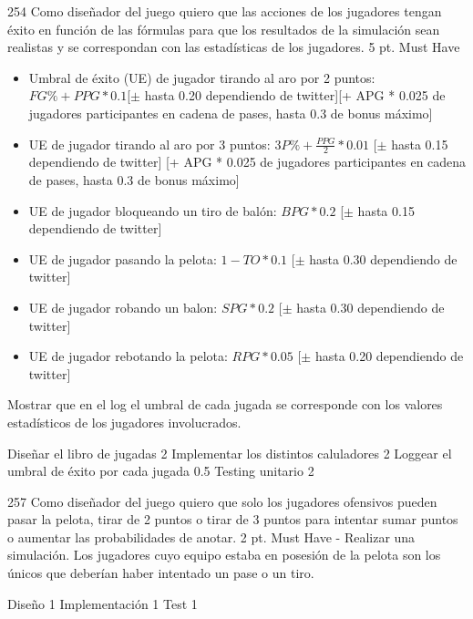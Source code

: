 \sprintstory
{254}
{Como diseñador del juego quiero que las acciones de los jugadores tengan éxito en función de las fórmulas para que los resultados de la simulación sean realistas y se correspondan con las estadísticas de los jugadores.}
{5 pt.}
{Must Have}
{\begin{itemize}
    \item Umbral de éxito (UE) de jugador tirando al aro por 2 puntos: $FG\% + PPG*0.1 $[$\pm$ hasta 0.20 dependiendo de twitter][+ APG * 0.025 de jugadores participantes en cadena de pases, hasta 0.3 de bonus máximo] 
    \item UE de jugador tirando al aro por 3 puntos: $3P\% + \frac{PPG}{2}* 0.01$ [$\pm$ hasta 0.15 dependiendo de twitter] [+ APG * 0.025 de jugadores participantes en cadena de pases, hasta 0.3 de bonus máximo]
    \item UE de jugador bloqueando un tiro de balón: $BPG * 0.2$ [$\pm$ hasta 0.15 dependiendo de twitter]
    \item UE de jugador pasando la pelota: $1 - TO * 0.1$ [$\pm$ hasta 0.30 dependiendo de twitter]
    \item UE de jugador robando un balon: $SPG * 0.2$ [$\pm$ hasta 0.30 dependiendo de twitter]
    \item UE de jugador rebotando la pelota: $RPG * 0.05$ [$\pm$ hasta 0.20 dependiendo de twitter]
\end{itemize}}
{Mostrar que en el log el umbral de cada jugada se corresponde con los valores estadísticos de los jugadores involucrados.}

\begin{taskstable}
 \task
 {Diseñar el libro de jugadas}
 {2}
 \task
 {Implementar los distintos caluladores}
 {2}
 \task
 {Loggear el umbral de éxito por cada jugada}
 {0.5}
 \task
 {Testing unitario}
 {2}
\end{taskstable}

\vspace{1cm}


\sprintstory
{257}
{Como diseñador del juego quiero que solo los jugadores ofensivos pueden pasar la pelota, tirar de 2 puntos o tirar de 3 puntos para intentar sumar puntos o aumentar las probabilidades de anotar.}
{2 pt.}
{Must Have}
{-}
{Realizar una simulación. Los jugadores cuyo equipo estaba en posesión de la pelota son los únicos que deberían haber intentado un pase o un tiro.}

\begin{taskstable}
 \task
 {Diseño}
 {1}
 \task
 {Implementación}
 {1}
 \task
 {Test}
 {1}
\end{taskstable}

